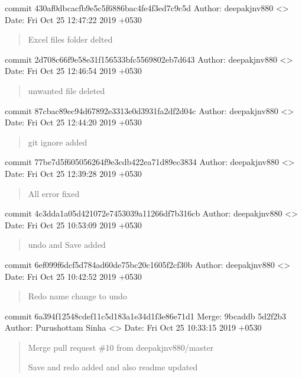 \documentclass[letterpaper,10pt,english]{sphinxmanual}
\begin{document}
commit 430af0dbcacfb9e5c5f6886bac4fe4f3ed7c9c5d
Author: deepakjnv880 \textless{}\textgreater{}
Date:   Fri Oct 25 12:47:22 2019 +0530
\begin{quote}

Excel files folder delted
\end{quote}

commit 2d708c66f9e58e31f156533bfc5569802eb7d643
Author: deepakjnv880 \textless{}\textgreater{}
Date:   Fri Oct 25 12:46:54 2019 +0530
\begin{quote}

unwanted file deleted
\end{quote}

commit 87cbac89ec94d67892e3313e0d3931fa2df2d04c
Author: deepakjnv880 \textless{}\textgreater{}
Date:   Fri Oct 25 12:44:20 2019 +0530
\begin{quote}

git ignore added
\end{quote}

commit 77be7d5f605056264f9e3cdb422ea71d89ec3834
Author: deepakjnv880 \textless{}\textgreater{}
Date:   Fri Oct 25 12:39:28 2019 +0530
\begin{quote}

All error fixed
\end{quote}

commit 4c3dda1a05d421072e7453039a11266df7b316cb
Author: deepakjnv880 \textless{}\textgreater{}
Date:   Fri Oct 25 10:53:09 2019 +0530
\begin{quote}

undo and Save added
\end{quote}

commit 6ef099f6dcf5d784ad60de75bc20c1605f2cf30b
Author: deepakjnv880 \textless{}\textgreater{}
Date:   Fri Oct 25 10:42:52 2019 +0530
\begin{quote}

Redo name change to undo
\end{quote}

commit 6a394f12548cdef11c5d183a1e34d1f3e86e71d1
Merge: 9bcaddb 5d2f2b3
Author: Purushottam Sinha \textless{}\textgreater{}
Date:   Fri Oct 25 10:33:15 2019 +0530
\begin{quote}

Merge pull request \#10 from deepakjnv880/master

Save and redo added and also readme updated
\end{quote}
\end{document}
